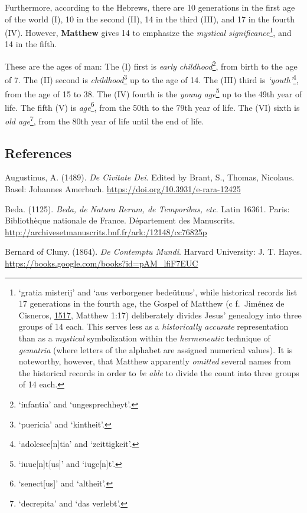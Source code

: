 \documentclass[
]{article}
\begin{document}
Furthermore, according to the Hebrews, there are 10 generations in the
first age of the world (I), 10 in the second (II), 14 in the third
(III), and 17 in the fourth (IV). However, \textbf{Matthew} gives 14 to
emphasize the \emph{mystical significance}\footnote{`gratia misterij'
  and `aus verborgener bedeütnus', while historical records list 17
  generations in the fourth age, the Gospel of Matthew (c f.~Jiménez de
  Cisneros, \href{https://doi.org/10.3931/e-rara-46695}{1517}, Matthew
  1:17) deliberately divides Jesus' genealogy into three groups of 14
  each. This serves less as a \emph{historically accurate}
  representation than as a \emph{mystical} symbolization within the
  \emph{hermeneutic} technique of \emph{gematria} (where letters of the
  alphabet are assigned numerical values). It is noteworthy, however,
  that Matthew apparently \emph{omitted} several names from the
  historical records in order to \emph{be able} to divide the count into
  three groups of 14 each.}, and 14 in the fifth.

These are the ages of man: The (I) first is \emph{early
childhood}\footnote{`infantia' and `ungesprechheyt'.}, from birth to the
age of 7. The (II) second is \emph{childhood}\footnote{`puericia' and
  `kintheit'.} up to the age of 14. The (III) third is
\emph{`youth'}\footnote{`adolesce{[}n{]}tia' and `zeittigkeit'.}, from
the age of 15 to 38. The (IV) fourth is the \emph{young age}\footnote{`iuue{[}n{]}t{[}us{]}'
  and `iuge{[}n{]}t'.} up to the 49th year of life. The fifth (V) is
\emph{age}\footnote{`senect{[}us{]}' and `altheit'.}, from the 50th to
the 79th year of life. The (VI) sixth is \emph{old age}\footnote{`decrepita'
  and `das verlebt'.}, from the 80th year of life until the end of life.

\hypertarget{references}{%
\subsection{References}\label{references}}

Augustinus, A. (1489). \emph{De Civitate Dei}. Edited by Brant, S.,
Thomas, Nicolaus. Basel: Johannes Amerbach.
\url{https://doi.org/10.3931/e-rara-12425}

Beda. (1125). \emph{Beda, de Natura Rerum, de Temporibus, etc}. Latin
16361. Paris: Bibliothèque nationale de France. Département des
Manuscrits. \url{http://archivesetmanuscrits.bnf.fr/ark:/12148/cc76825p}

Bernard of Cluny. (1864). \emph{De Contemptu Mundi}. Harvard University:
J. T. Hayes. \url{https://books.google.com/books?id=pAM_lfiF7EUC}
\end{document}
